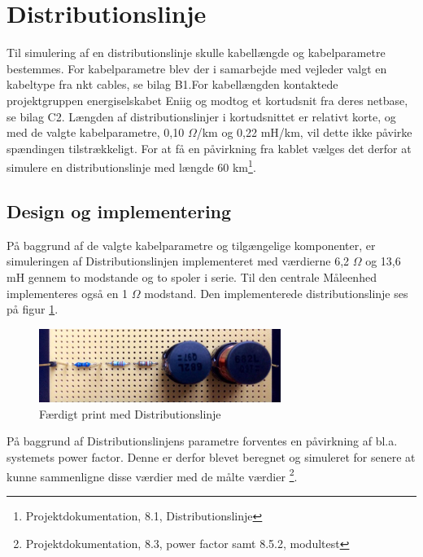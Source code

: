 
\section{Distributionslinje}

Til simulering af en distributionslinje skulle kabellængde og kabelparametre bestemmes. For kabelparametre blev der i samarbejde med vejleder valgt en kabeltype fra nkt cables, se bilag B1.For kabellængden kontaktede projektgruppen energiselskabet Eniig og modtog et kortudsnit fra deres netbase, se bilag C2. Længden af distributionslinjer i kortudsnittet er relativt korte, og med de valgte kabelparametre, 0,10 $\Omega$/km og 0,22 mH/km, vil dette ikke påvirke spændingen tilstrækkeligt. For at få en påvirkning fra kablet vælges det derfor at simulere en distributionslinje med længde 60 km\footnote{Projektdokumentation, 8.1, Distributionslinje}.  

\subsection{Design og implementering}

På baggrund af de valgte kabelparametre og tilgængelige komponenter, er simuleringen af Distributionslinjen implementeret med værdierne 6,2 $\Omega$ og 13,6 mH gennem to modstande og to spoler i serie. Til den centrale Måleenhed implementeres også en 1 $\Omega$ modstand. Den implementerede distributionslinje ses på figur \ref{fig:DisbLinje}.

\begin{figure}[H]
	\centering
	\includegraphics[width=0.7\textwidth]{figure/Distributionslinje}
	\caption{Færdigt print med Distributionslinje}
	\label{fig:DisbLinje}
\end{figure}

På baggrund af Distributionslinjens parametre forventes en påvirkning af bl.a. systemets power factor. Denne er derfor blevet beregnet og simuleret for senere at kunne sammenligne disse værdier med de målte værdier \footnote{Projektdokumentation, 8.3, power factor samt 8.5.2, modultest}. 